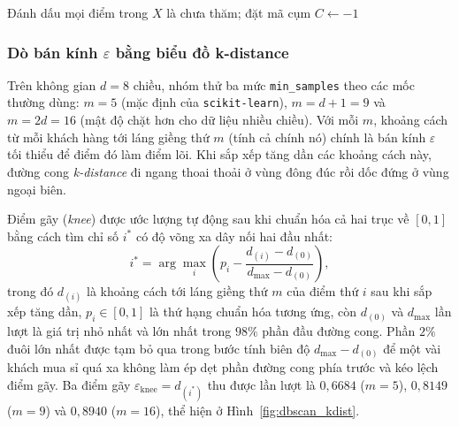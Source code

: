 \documentclass[12pt,a4paper]{article}
\numberwithin{equation}{section}
\numberwithin{table}{section}
\numberwithin{figure}{section}
\begin{document}
\begin{algorithm}[H]
\caption{Thuật toán DBSCAN}
\label{alg:dbscan}
Đánh dấu mọi điểm trong $X$ là chưa thăm; đặt mã cụm $C \leftarrow -1$\;
\;
\end{algorithm}

\subsubsection{Dò bán kính \texorpdfstring{$\varepsilon$}{eps} bằng biểu đồ k-distance}

Trên không gian $d = 8$ chiều, nhóm thử ba mức \texttt{min\_samples} theo các mốc thường dùng: $m = 5$ (mặc định của \texttt{scikit-learn}), $m = d + 1 = 9$ và $m = 2d = 16$ (mật độ chặt hơn cho dữ liệu nhiều chiều). Với mỗi $m$, khoảng cách từ mỗi khách hàng tới láng giềng thứ $m$ (tính cả chính nó) chính là bán kính $\varepsilon$ tối thiểu để điểm đó làm điểm lõi. Khi sắp xếp tăng dần các khoảng cách này, đường cong \emph{k-distance} đi ngang thoai thoải ở vùng đông đúc rồi dốc đứng ở vùng ngoại biên.

Điểm gãy (\emph{knee}) được ước lượng tự động sau khi chuẩn hóa cả hai trục về $[0, 1]$ bằng cách tìm chỉ số $i^*$ có độ võng xa dây nối hai đầu nhất:
\begin{equation}
    i^* = \arg\max_i \left( p_i - \frac{d_{(i)} - d_{(0)}}{d_{\max} - d_{(0)}} \right),
    \label{eq:knee}
\end{equation}
trong đó $d_{(i)}$ là khoảng cách tới láng giềng thứ $m$ của điểm thứ $i$ sau khi sắp xếp tăng dần, $p_i \in [0, 1]$ là thứ hạng chuẩn hóa tương ứng, còn $d_{(0)}$ và $d_{\max}$ lần lượt là giá trị nhỏ nhất và lớn nhất trong $98\%$ phần đầu đường cong. Phần $2\%$ đuôi lớn nhất được tạm bỏ qua trong bước tính biên độ $d_{\max} - d_{(0)}$ để một vài khách mua sỉ quá xa không làm ép dẹt phần đường cong phía trước và kéo lệch điểm gãy. Ba điểm gãy $\varepsilon_{\text{knee}} = d_{(i^*)}$ thu được lần lượt là $0,6684$ ($m=5$), $0,8149$ ($m=9$) và $0,8940$ ($m=16$), thể hiện ở Hình~\ref{fig:dbscan_kdist}.
\end{document}
